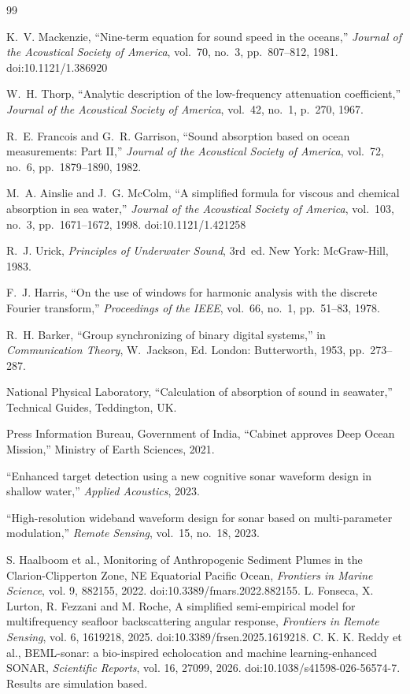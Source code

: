 \documentclass[conference,a4paper]{IEEEtran}
\begin{document}
\clearpage
\raggedbottom
\begin{thebibliography}{99}
\small

K.~V. Mackenzie, ``Nine-term equation for sound speed in the oceans,''
\textit{Journal of the Acoustical Society of America}, vol.~70, no.~3,
pp.~807--812, 1981. doi:10.1121/1.386920

W.~H. Thorp, ``Analytic description of the low-frequency attenuation
coefficient,'' \textit{Journal of the Acoustical Society of America}, vol.~42,
no.~1, p.~270, 1967.

R.~E. Francois and G.~R. Garrison, ``Sound absorption based on ocean
measurements: Part II,'' \textit{Journal of the Acoustical Society of America},
vol.~72, no.~6, pp.~1879--1890, 1982.

M.~A. Ainslie and J.~G. McColm, ``A simplified formula for viscous and chemical
absorption in sea water,'' \textit{Journal of the Acoustical Society of
America}, vol.~103, no.~3, pp.~1671--1672, 1998. doi:10.1121/1.421258

R.~J. Urick, \textit{Principles of Underwater Sound}, 3rd~ed. New York:
McGraw-Hill, 1983.

F.~J. Harris, ``On the use of windows for harmonic analysis with the discrete
Fourier transform,'' \textit{Proceedings of the IEEE}, vol.~66, no.~1,
pp.~51--83, 1978.

R.~H. Barker, ``Group synchronizing of binary digital systems,'' in
\textit{Communication Theory}, W.~Jackson, Ed. London: Butterworth, 1953,
pp.~273--287.

National Physical Laboratory, ``Calculation of absorption of sound in
seawater,'' Technical Guides, Teddington, UK.

Press Information Bureau, Government of India, ``Cabinet approves Deep Ocean
Mission,'' Ministry of Earth Sciences, 2021.

``Enhanced target detection using a new cognitive sonar waveform design in
shallow water,'' \textit{Applied Acoustics}, 2023.

``High-resolution wideband waveform design for sonar based on multi-parameter
modulation,'' \textit{Remote Sensing}, vol.~15, no.~18, 2023.


S. Haalboom et al., Monitoring of Anthropogenic Sediment Plumes in the Clarion-Clipperton Zone, NE Equatorial Pacific Ocean, \textit{Frontiers in Marine Science}, vol. 9, 882155, 2022. doi:10.3389/fmars.2022.882155.
L. Fonseca, X. Lurton, R. Fezzani and M. Roche, A simplified semi-empirical model for multifrequency seafloor backscattering angular response, \textit{Frontiers in Remote Sensing}, vol. 6, 1619218, 2025. doi:10.3389/frsen.2025.1619218.
C. K. K. Reddy et al., BEML-sonar: a bio-inspired echolocation and machine learning-enhanced SONAR, \textit{Scientific Reports}, vol. 16, 27099, 2026. doi:10.1038/s41598-026-56574-7. Results are simulation based.


\end{thebibliography}
\end{document}
